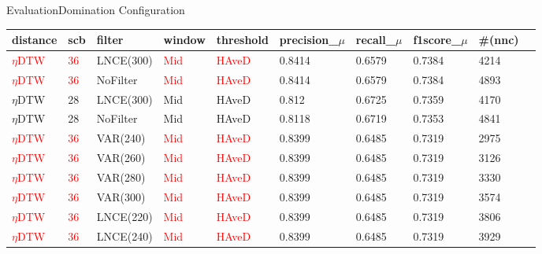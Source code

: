 \begin{frame}{Evaluation}{Domination Configuration}
    \begin{center}
        \tiny
        \begin{tabular}{llllllllll}
            \textbf{distance} & \textbf{scb} & \textbf{filter} & \textbf{window} & \textbf{threshold} & \textbf{precision\_$\mu$} & \textbf{recall\_$\mu$} & \textbf{f1score\_$\mu$} & \textbf{\#(nnc)}\\
            \hline
            \textcolor{red}{$\eta$DTW} & \textcolor{red}{36} & LNCE(300) & \textcolor{red}{Mid}  & \textcolor{red}{HAveD} & 0.8414 & 0.6579 & 0.7384 & 4214\\
            \textcolor{red}{$\eta$DTW} & \textcolor{red}{36} & NoFilter & \textcolor{red}{Mid}  & \textcolor{red}{HAveD} & 0.8414 & 0.6579 & 0.7384 & 4893\\
            $\eta$DTW & 28 & LNCE(300) & Mid  & HAveD & 0.812 & 0.6725 & 0.7359 & 4170\\
            $\eta$DTW & 28 & NoFilter & Mid  & HAveD & 0.8118 & 0.6719 & 0.7353 & 4841\\
            \textcolor{red}{$\eta$DTW} & \textcolor{red}{36} & VAR(240) & \textcolor{red}{Mid}  & \textcolor{red}{HAveD} & 0.8399 & 0.6485 & 0.7319 & 2975\\
            \textcolor{red}{$\eta$DTW} & \textcolor{red}{36} & VAR(260) & \textcolor{red}{Mid}  & \textcolor{red}{HAveD} & 0.8399 & 0.6485 & 0.7319 & 3126\\
            \textcolor{red}{$\eta$DTW} & \textcolor{red}{36} & VAR(280) & \textcolor{red}{Mid}  & \textcolor{red}{HAveD} & 0.8399 & 0.6485 & 0.7319 & 3330\\
            \textcolor{red}{$\eta$DTW} & \textcolor{red}{36} & VAR(300) & \textcolor{red}{Mid}  & \textcolor{red}{HAveD} & 0.8399 & 0.6485 & 0.7319 & 3574\\
            \textcolor{red}{$\eta$DTW} & \textcolor{red}{36} & LNCE(220) & \textcolor{red}{Mid}  & \textcolor{red}{HAveD} & 0.8399 & 0.6485 & 0.7319 & 3806\\
            \textcolor{red}{$\eta$DTW} & \textcolor{red}{36} & LNCE(240) & \textcolor{red}{Mid}  & \textcolor{red}{HAveD} & 0.8399 & 0.6485 & 0.7319 & 3929
        \end{tabular}
    \end{center}
\end{frame}

